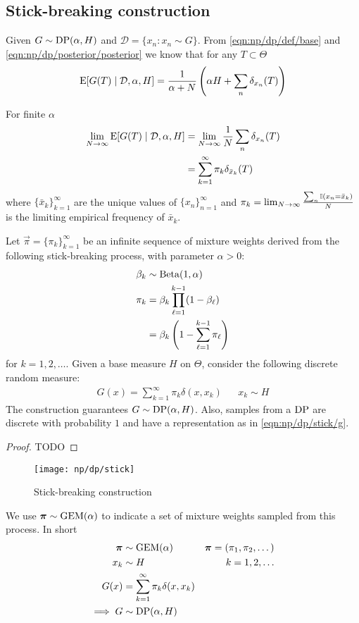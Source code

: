 \subsection{Stick-breaking construction}
Given $G \sim \operatorname{DP}(\alpha, H)$ and $\mathcal D = \{x_n: x_n \sim G\}$. From \eqref{eqn:np/dp/def/base} and \eqref{eqn:np/dp/posterior/posterior} we know that for any $T \subset \Theta$
\begin{equation}
	\operatorname{\mathrm{E}}[G(T) \mid \mathcal D, \alpha, H] = \frac{1}{\alpha + N} \left(\alpha H + \sum_n \delta_{x_n}(T)\right)
\end{equation}

For finite $\alpha$
\begin{align*}
	\lim_{N \to \infty} \operatorname{\mathrm{E}}[G(T) \mid \mathcal D, \alpha, H] &= \lim_{N \to \infty} \frac{1}{N} \sum_n \delta_{x_n}(T) \\
															&= \sum_{k = 1}^\infty \pi_k \delta_{\bar x_k}(T)
\end{align*}
where $\{\bar x_k\}_{k = 1}^\infty$ are the unique values of $\{x_n\}_{n = 1}^\infty$ and $\pi_k = \lim_{N \to \infty} \frac{\sum_n \operatorname{\mathbb I}(x_n = \bar x_k)}{N}$ is the limiting empirical frequency of $\bar x_k$.

\begin{theorem}
	Let $\vec \pi = \{\pi_k\}_{k = 1}^\infty$ be an infinite sequence of mixture weights derived from the following stick-breaking process, with parameter $\alpha > 0$:
	\begin{align}
		\beta_k		&\sim \operatorname{Beta}(1, \alpha) \\
		\pi_k		&= \beta_k \prod_{\ell = 1}^{k - 1} (1 - \beta_\ell) \\
					&= \beta_k \left(1 - \sum_{\ell = 1}^{k - 1} \pi_\ell\right)
	\end{align}
	for $k = 1, 2, \dotsc$. Given a base measure $H$ on $\Theta$, consider the following discrete random measure:
	\begin{align}
		G(x) = \sum_{k = 1}^\infty \pi_k \delta(x, x_k)		&& x_k \sim H \label{eqn:np/dp/stick/g}
	\end{align}
	The construction guarantees $G \sim \operatorname{DP}(\alpha, H)$. Also, samples from a $\operatorname{DP}$ are discrete with probability $1$ and have a representation as in \eqref{eqn:np/dp/stick/g}.
\end{theorem}

\begin{proof}
	TODO
\end{proof}

\begin{figure}[h!]
	\centering
	\texttt{[image: np/dp/stick]}
	\caption{Stick-breaking construction}
\end{figure}

We use $\boldsymbol{\mathbf{\pi}} \sim \operatorname{GEM}(\alpha)$ to indicate a set of mixture weights sampled from this process. In short
\begin{align*}
	\boldsymbol{\mathbf{\pi}} 	&\sim \operatorname{GEM}(\alpha)	& \boldsymbol{\mathbf{\pi}} = (\pi_1, \pi_2, \dotsc)\\
	x_k			&\sim H 			& k = 1, 2, \dotsc \\
	G(x) 		&= \sum_{k = 1}^\infty \pi_k \delta(x, x_k) \\
	\implies G 	&\sim \operatorname{DP}(\alpha, H)
\end{align*}
